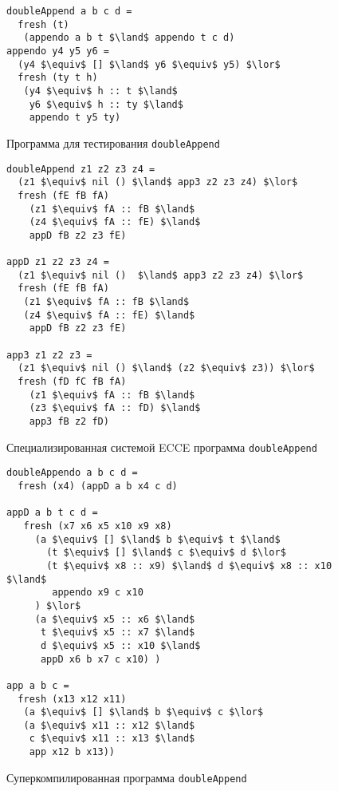 \begin{figure}[h!]
\begin{lstlisting}
doubleAppend a b c d =
  fresh (t)
   (appendo a b t $\land$ appendo t c d)
appendo y4 y5 y6 =
  (y4 $\equiv$ [] $\land$ y6 $\equiv$ y5) $\lor$
  fresh (ty t h)
   (y4 $\equiv$ h :: t $\land$
    y6 $\equiv$ h :: ty $\land$
    appendo t y5 ty)
\end{lstlisting}
\caption{Программа для тестирования \lstinline{doubleAppend}}
\end{figure}

\begin{figure}[h!]
\begin{lstlisting}
doubleAppend z1 z2 z3 z4 =
  (z1 $\equiv$ nil () $\land$ app3 z2 z3 z4) $\lor$
  fresh (fE fB fA)
    (z1 $\equiv$ fA :: fB $\land$
    (z4 $\equiv$ fA :: fE) $\land$
    appD fB z2 z3 fE)

appD z1 z2 z3 z4 =
  (z1 $\equiv$ nil ()  $\land$ app3 z2 z3 z4) $\lor$
  fresh (fE fB fA)
   (z1 $\equiv$ fA :: fB $\land$
   (z4 $\equiv$ fA :: fE) $\land$
    appD fB z2 z3 fE)

app3 z1 z2 z3 =
  (z1 $\equiv$ nil () $\land$ (z2 $\equiv$ z3)) $\lor$
  fresh (fD fC fB fA)
    (z1 $\equiv$ fA :: fB $\land$
    (z3 $\equiv$ fA :: fD) $\land$
    app3 fB z2 fD)
\end{lstlisting}
\caption{Специализированная системой ECCE программа \lstinline{doubleAppend}}
\end{figure}

\begin{figure}[h!]
\begin{lstlisting}
doubleAppendo a b c d =
  fresh (x4) (appD a b x4 c d)

appD a b t c d =
   fresh (x7 x6 x5 x10 x9 x8)
     (a $\equiv$ [] $\land$ b $\equiv$ t $\land$
       (t $\equiv$ [] $\land$ c $\equiv$ d $\lor$
       (t $\equiv$ x8 :: x9) $\land$ d $\equiv$ x8 :: x10 $\land$
        appendo x9 c x10
     ) $\lor$
     (a $\equiv$ x5 :: x6 $\land$
      t $\equiv$ x5 :: x7 $\land$
      d $\equiv$ x5 :: x10 $\land$
      appD x6 b x7 c x10) ) 

app a b c =
  fresh (x13 x12 x11)
   (a $\equiv$ [] $\land$ b $\equiv$ c $\lor$
   (a $\equiv$ x11 :: x12 $\land$
    c $\equiv$ x11 :: x13 $\land$
    app x12 b x13))
\end{lstlisting}
\caption{Суперкомпилированная программа \lstinline{doubleAppend}}
\end{figure}
